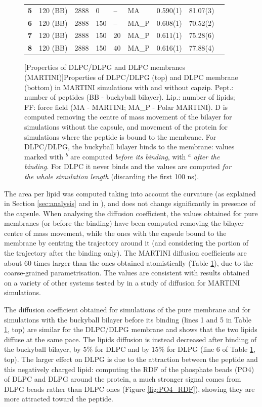 \begin{figure}
\begin{tabular}{lllllllll}
 \hline
\textbf{5} & 120 (BB) & 2888 & 0 & -- & MA & 0.590(1) & 81.07(3) & \\ 
\textbf{6} & 120 (BB) & 2888 & 150 & -- & MA\_P & 0.608(1) & 70.52(2) &  \\
\textbf{7} & 120 (BB) & 2888 & 150 & 20 & MA\_P & 0.611(1) & 75.28(6) & \\
\textbf{8} & 120 (BB) & 2888 & 150 & 40 & MA\_P & 0.616(1) & 77.88(4) & \\
 \hline
\end{tabular}
\vspace {0.5cm}
[Properties of DLPC/DLPG and DLPC membranes (MARTINI)]{Properties of DLPC/DLPG (top) and DLPC membrane (bottom) in MARTINI simulations with and without capzip. Pept.: number of peptides (BB - buckyball bilayer). Lip.: number of lipids; FF: force field (MA - MARTINI; MA\_P - Polar MARTINI).
%
D is computed removing the centre of mass movement of the bilayer for simulations without the capsule, and movement of the protein for simulations where the peptide is bound to the membrane. For DLPC/DLPG, the buckyball bilayer binds to the membrane: values marked with $^b$ are computed \emph{before its binding}, with $^a$ \emph{after the binding}.
%
For DLPC it never binds and the values are computed \emph{for the whole simulation length} (discarding the first 100 ns).}
\label{table:martini_diff}
\vspace{1.5cm}
\end{figure}

The area per lipid was computed taking into account the curvature (as explained in Section \ref{sec:analysis} and in \citet{Braun2011}), and does not change significantly in presence of the capsule.
%
When analysing the diffusion coefficient, the values obtained for pure membranes (or before the binding) have been computed removing the bilayer centre of mass movement, while the ones with the capsule bound to the membrane by centring the trajectory around it (and considering the portion of the trajectory after the binding only). The MARTINI diffusion coefficients are about 60 times larger than the ones obtained atomistically (Table \ref{table:martini_diff}), due to the coarse-grained parametrisation. The values are consistent with results obtained on a variety of other systems tested by \citet{Venable2017} in a study of diffusion for MARTINI simulations.

The diffusion coefficient obtained for simulations of the pure membrane and for simulations with the buckyball bilayer before its binding (lines 1 and 5 in Table \ref{table:martini_diff}, top) are similar for the DLPC/DLPG membrane and shows that the two lipids diffuse at the same pace.
%
The lipids diffusion is instead decreased after binding of the buckyball bilayer, by 5\% for DLPC and by 15\% for DLPG (line 6 of Table \ref{table:martini_diff}, top). The larger effect on DLPG is due to the attraction between the peptide and this negatively charged lipid: computing the RDF of the phosphate beads (PO4) of DLPC and DLPG around the protein, a much stronger signal comes from DLPG beads rather than DLPC ones (Figure \ref{fig:PO4_RDF}), showing they are more attracted toward the peptide.

